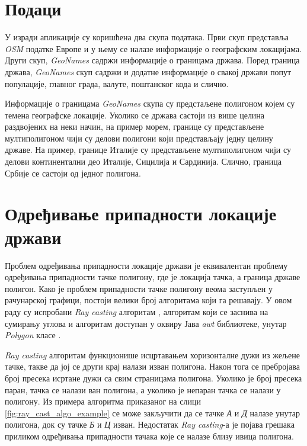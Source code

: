 \documentclass[12pt,oneside]{memoir}
\begin{document}
\section{Подаци}
\label{sec:osm_spark_podaci}

У изради апликације су коришћена два скупа података. Први скуп представља \textit{OSM} податке Европе и у њему се налазе информације о географским локацијама. Други скуп, \textit{GeoNames} \cite{geonames} садржи информације о границама држава. Поред граница држава, \textit{GeoNames} скуп садржи и додатне информације о свакој држави попут популације, главног града, валуте, поштанског кода и слично.

Информације о границама \textit{GeoNames} скупа су предстаљене полигоном којем су темена географске локације. Уколико се држава састоји из више целина раздвојених на неки начин, на пример морем, границе су представљене мултиполигоном чији су делови полигони који представљају једну целину државе. На пример, границе Италије су представљене мултиполигоном чији су делови континентални део Италије, Сицилија и Сардинија. Слично, граница Србије се састоји од једног полигона.

\section{Одређивање припадности локације држави}
\label{sec:poly_cont}

Проблем одређивања припадности локације држави је еквивалентан проблему одређивања припадности тачке полигону, где је локација тачка, а граница државе полигон. Како је проблем припадности тачке полигону веома заступљен у рачунарској графици, постоји велики број алгоритама који га решавају. У овом раду су испробани \textit{Ray casting} алгоритам \cite{inside_polygon}, алгоритам који се заснива на сумирању углова \cite{inside_polygon} и алгоритам доступан у оквиру Јава \textit{awt} библиотеке, унутар \textit{Polygon} класе \cite{java_awt_polygon}.

\textit{Ray casting} алгоритам функционише исцртавањем хоризонталне дужи из жељене тачке, такве да јој се други крај налази изван полигона. Након тога се пребројава број пресека исртане дужи са свим страницама полигона. Уколико је број пресека паран, тачка се налази ван полигона, а уколико је непаран тачка се налази у полигону. Из примера алгоритма приказаног на слици \ref{fig:ray_cast_algo_example} се може закључити да се тачке \textit{А} и \textit{Д} налазе унутар полигона, док су тачке \textit{Б} и \textit{Ц} изван. Недостатак \textit{Ray casting}-а је појава грешака приликом одређивања припадности тачака које се налазе близу ивица полигона. %
\end{document}
